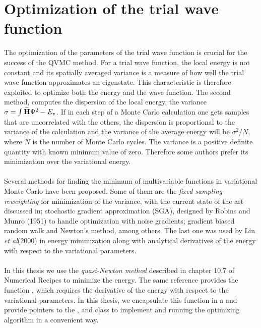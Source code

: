 \section{Optimization of the trial wave function}
The optimization of the parameters of the trial wave function is crucial for the success of the QVMC method. For a trial wave function, the local energy is not constant and its spatially averaged variance is a measure of how well the trial wave function approximates an eigenstate\cite{PaulKent}. This characteristic is therefore exploited to optimize both the energy and the wave function. The second method, computes the dispersion of the local energy, the variance $\sigma = \int {\bf\widehat{H}}\Psi^2 - E_v$. If in each step of a Monte Carlo calculation one gets samples that are uncorrelated with the others, the dispersion is proportional to the variance of the calculation and the variance of the average energy will be $\sigma^2/N$, where $N$ is the number of Monte Carlo cycles. The variance is a positive definite quantity with known minimum value of zero. Therefore some authors prefer its minimization over the variational energy\cite{Ceperley1996}. \\
\\
Several methods for finding the minimum of multivariable functions in variational Monte Carlo have been proposed. Some of them are the \emph{fixed sampling reweighting} for minimization of the variance, with the current state of the art discussed in\cite{PaulKent}; stochastic gradient approximation (SGA), designed by Robins and Munro (1951) to handle optimization with noise gradients; gradient biased random walk and Newton's method, among others\cite{Dewing2001,PaulKent}. The last one was used by Lin \emph{et al}(2000) \cite{Lin2008} in energy minimization along with analytical derivatives of the energy with respect to the variational parameters.\\
\\
\noindent
In this thesis we use the \emph{quasi-Newton method} described in chapter 10.7 of Numerical Recipes\cite{NR} to minimize the energy. The same reference provides the function , which requires the derivative of the energy with respect to the variational parameters. In this thesis, we encapsulate this function in a  and provide pointers to the ,  and  class to implement and running the optimizing algorithm in a convenient way. 

